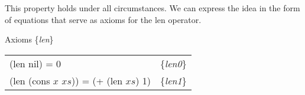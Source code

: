 \begin{comment} ...suppressing defthm for now...
When a property holds under all circumstances, we can sometimes use the automated logic of ACL2 to prove it. To do so, we formulate the property as a theorem and press the ``Start'' button in the Dracula proof panel (right side of Dracula window). When the ``ACL2!\verb+>+'' prompt appears in the lower pane in the proof panel, we press the ``Admit'' arrow, and the automated logic of ACL2 starts trying to prove the theorem.

Theorem definitions are similar to property definitions, but the keyword is ``defthmd'' instead of ``defproperty''. The following theorem definition states the len-test property in a form that the automated logic of ACL2 can use to attempt a proof that the property holds under all circumstances.

\label{len-thm}
\begin{lstlisting}
(defthmd len-thm
  (= (len xs)
     (if (consp xs)
         (+ 1 (len (rest xs))) ; {len1}
         0)))                  ; {len0}
\end{lstlisting}

ACL2 interprets variables in theorems as if they were universally quantified. So, the formula ``(= (len $xs$) (if (consp $xs$) (+ 1 (len (rest $xs$))) 0))'' in the definition of len-thm means ``($\forall$$xs$.(= (len $xs$) (if (consp $xs$) (+ 1 (len (rest $xs$))) 0)))''.
In this case, ACL2 successfully proves the theorem, and Dracula colors the theorem green. (If ACL2 had failed to prove the theorem, Dracula would have colored it pink.) Because ACL2 succeeds in proving the theorem, we know that the ``len-test'' property from our doublecheck testing is true under all circumstances. We can cite this fact in proofs.

The len theorem contains two formulas that have the same meaning as (len $xs$). One of them, which we have labeled ``\{\emph{len1}\}'', applies when the argument in an invocation of len is a list with at least one element (that is, (consp $xs$) is true).  The other formula, which we have labeled ``\{\emph{len0}\}'', applies when the argument is the empty list (nil).
\end{comment}

This property holds under all circumstances. 
We can express the idea in the form of equations 
that serve as axioms for the len operator.
\begin{center}
Axioms \{\emph{len}\} \\
\begin{tabular}{ll}
(len nil) = 0                            & \{\emph{len0}\} \\
(len (cons $x$ $xs$)) = (+ (len $xs$) 1) & \{\emph{len1}\}
\label{len-equations}
\end{tabular}
\end{center}

